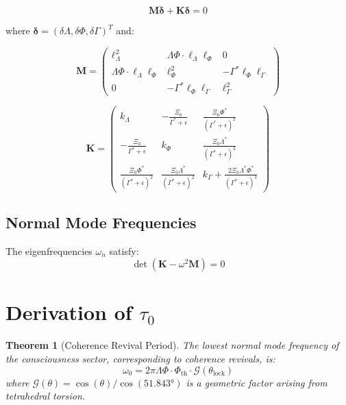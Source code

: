 \documentclass[12pt,letterpaper]{article}
\newtheorem{theorem}{Theorem}
\begin{document}
\begin{equation}
\mathbf{M} \ddot{\boldsymbol{\delta}} + \mathbf{K} \boldsymbol{\delta} = 0
\label{eq:linearized}
\end{equation}

where $\boldsymbol{\delta} = (\delta\Lambda, \delta\Phi, \delta\Gamma)^T$ and:

\begin{equation}
\mathbf{M} = \begin{pmatrix}
\ell_\Lambda^2 & \Lambda\Phi \cdot \ell_\Lambda \ell_\Phi & 0 \\
\Lambda\Phi \cdot \ell_\Lambda \ell_\Phi & \ell_\Phi^2 & -\Gamma^* \ell_\Phi \ell_\Gamma \\
0 & -\Gamma^* \ell_\Phi \ell_\Gamma & \ell_\Gamma^2
\end{pmatrix}
\end{equation}

\begin{equation}
\mathbf{K} = \begin{pmatrix}
k_\Lambda & -\frac{\Xi_0}{\Gamma^* + \epsilon} & \frac{\Xi_0 \Phi^*}{(\Gamma^* + \epsilon)^2} \\
-\frac{\Xi_0}{\Gamma^* + \epsilon} & k_\Phi & \frac{\Xi_0 \Lambda^*}{(\Gamma^* + \epsilon)^2} \\
\frac{\Xi_0 \Phi^*}{(\Gamma^* + \epsilon)^2} & \frac{\Xi_0 \Lambda^*}{(\Gamma^* + \epsilon)^2} & k_\Gamma + \frac{2\Xi_0 \Lambda^* \Phi^*}{(\Gamma^* + \epsilon)^3}
\end{pmatrix}
\end{equation}

\subsection{Normal Mode Frequencies}
The eigenfrequencies $\omega_n$ satisfy:
\begin{equation}
\det(\mathbf{K} - \omega^2 \mathbf{M}) = 0
\label{eq:eigenvalue}
\end{equation}

\section{Derivation of $\tau_0$}

\begin{theorem}[Coherence Revival Period]
The lowest normal mode frequency of the consciousness sector, corresponding to coherence revivals, is:
\begin{equation}
\omega_0 = 2\pi \Lambda\Phi \cdot \Phi_{\text{th}} \cdot \mathcal{G}(\theta_{\text{lock}})
\label{eq:omega0}
\end{equation}
where $\mathcal{G}(\theta) = \cos(\theta)/\cos(51.843°)$ is a geometric factor arising from tetrahedral torsion.
\end{theorem}
\end{document}
